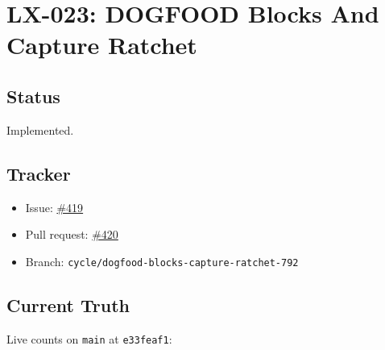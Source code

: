 \chapter{LX-023: DOGFOOD Blocks And Capture Ratchet}\label{record-199}

\smallskip

\section{Status}\label{record-199-status}

Implemented.

\section{Tracker}\label{record-199-tracker}

\begin{itemize}
\tightlist
\item
  Issue: \href{https://github.com/flyingrobots/bijou/issues/419}{\#419}
\item
  Pull request: \href{https://github.com/flyingrobots/bijou/pull/420}{\#420}
\item
  Branch: \texttt{c\allowbreak{}y\allowbreak{}c\allowbreak{}l\allowbreak{}e\allowbreak{}/\allowbreak{}d\allowbreak{}o\allowbreak{}g\allowbreak{}f\allowbreak{}o\allowbreak{}o\allowbreak{}d\allowbreak{}-\allowbreak{}b\allowbreak{}l\allowbreak{}o\allowbreak{}c\allowbreak{}k\allowbreak{}s\allowbreak{}-\allowbreak{}c\allowbreak{}a\allowbreak{}p\allowbreak{}t\allowbreak{}u\allowbreak{}r\allowbreak{}e\allowbreak{}-\allowbreak{}r\allowbreak{}a\allowbreak{}t\allowbreak{}c\allowbreak{}h\allowbreak{}e\allowbreak{}t\allowbreak{}-\allowbreak{}7\allowbreak{}9\allowbreak{}2}
\end{itemize}

\section{Current Truth}\label{record-199-current-truth}

Live counts on \texttt{m\allowbreak{}a\allowbreak{}i\allowbreak{}n} at \texttt{e\allowbreak{}3\allowbreak{}3\allowbreak{}f\allowbreak{}e\allowbreak{}a\allowbreak{}f\allowbreak{}1}:

